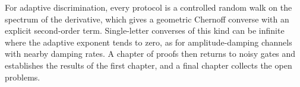 For adaptive discrimination, every protocol is a controlled random walk on the spectrum of the derivative, which gives a geometric Chernoff converse with an explicit second-order term. Single-letter converses of this kind can be infinite where the adaptive exponent tends to zero, as for amplitude-damping channels with nearby damping rates. A chapter of proofs then returns to noisy gates and establishes the results of the first chapter, and a final chapter collects the open problems.
